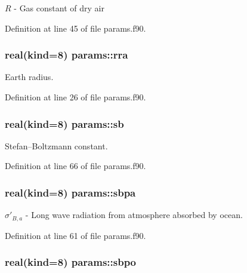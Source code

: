$R$ -\/ Gas constant of dry air 



Definition at line 45 of file params.\-f90.

\hypertarget{classparams_a192b2aa859cdeb4a0e285bcd0af346f4}{
\subsubsection[{rra}]{\setlength{\rightskip}{0pt plus 5cm}real(kind=8) params\-::rra}}\label{classparams_a192b2aa859cdeb4a0e285bcd0af346f4}


Earth radius. 



Definition at line 26 of file params.\-f90.

\hypertarget{classparams_a7e4a380117958612bc5cf4cac910b483}{
\subsubsection[{sb}]{\setlength{\rightskip}{0pt plus 5cm}real(kind=8) params\-::sb}}\label{classparams_a7e4a380117958612bc5cf4cac910b483}


Stefan–\-Boltzmann constant. 



Definition at line 66 of file params.\-f90.

\hypertarget{classparams_abf0cb93f1f5b90e3cfd2c70d88c92d38}{
\subsubsection[{sbpa}]{\setlength{\rightskip}{0pt plus 5cm}real(kind=8) params\-::sbpa}}\label{classparams_abf0cb93f1f5b90e3cfd2c70d88c92d38}


$\sigma'_{B,a}$ -\/ Long wave radiation from atmosphere absorbed by ocean. 



Definition at line 61 of file params.\-f90.

\hypertarget{classparams_a630ac570afd5c9c7030ca416f3a860a4}{
\subsubsection[{sbpo}]{\setlength{\rightskip}{0pt plus 5cm}real(kind=8) params\-::sbpo}}\label{classparams_a630ac570afd5c9c7030ca416f3a860a4}



